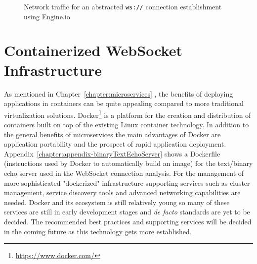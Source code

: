 \newpage
\begin{figure}[h!]
	\centering
	\caption{Network traffic for an abstracted \texttt{ws://} connection establishment using Engine.io}
	\label{fig:engineioTraffic}
\end{figure}

\section{Containerized WebSocket Infrastructure}

As mentioned in Chapter~\ref{chapter:microservices} , the benefits of deploying applications in containers can be quite appealing compared to more traditional virtualization solutions. Docker\footnote{\url{https://www.docker.com/}} is a platform for the creation and distribution of containers built on top of the existing Linux container technology. In addition to the general benefits of microservices the main advantages of Docker are application portability and the prospect of rapid application deployment. Appendix~\ref{chapter:appendix-binaryTextEchoServer} shows a Dockerfile (instructions used by Docker to automatically build an image) for the text/binary echo server used in the WebSocket connection analysis. For the management of more sophisticated "dockerized" infrastructure supporting services such as cluster management, service discovery tools and advanced networking capabilities are needed. Docker and its ecosystem is still relatively young so many of these services are still in early development stages and \textit{de facto} standards are yet to be decided. The recommended best practices and supporting services will be decided in the coming future as this technology gets more established.


